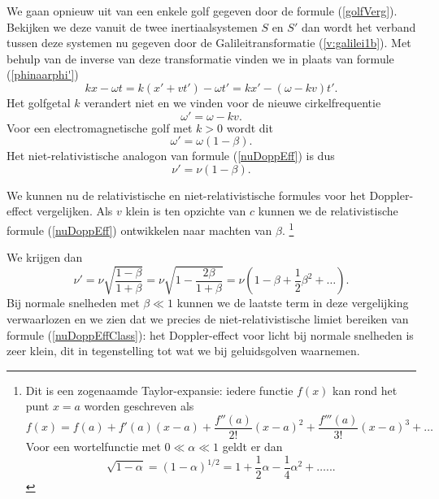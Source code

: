 We gaan opnieuw uit van een enkele golf gegeven door de formule
(\ref{golfVerg}). Bekijken we deze vanuit de twee inertiaalsystemen
$S$ en $S'$ dan wordt het verband tussen deze systemen nu gegeven door
de Galileitransformatie (\ref{v:galilei1b}). Met behulp van de
inverse van deze transformatie vinden we in plaats van formule
(\ref{phinaarphi'})
%
\begin{equation}
kx - \omega t = k(x' + vt') - \omega t' = kx' - (\omega - kv)t' .
\end{equation}
%
Het golfgetal $k$ verandert niet en we vinden voor de nieuwe cirkelfrequentie 
%
\begin{equation}
\omega' = \omega - kv .
\end{equation}
%
Voor een electromagnetische golf met $k > 0$ wordt dit
%
\begin{equation}
\omega' = \omega (1 - \beta) .
\end{equation}
%
Het niet-relativistische analogon van formule (\ref{nuDoppEff}) is dus 
%
\begin{equation} \label{nuDoppEffClass}
\nu' = \nu (1 - \beta) .
\end{equation}
%

We kunnen nu de relativistische en niet-relativistische formules voor het Doppler-effect vergelijken. Als $v$ klein is ten opzichte van $c$ kunnen we de relativistische formule (\ref{nuDoppEff}) ontwikkelen naar machten van $\beta$.
\footnote{ Dit is een zogenaamde Taylor-expansie: iedere functie $f(x)$
kan rond het punt $x = a$ worden geschreven als
\[
f(x) = f(a) + f'(a) (x - a) + \frac{f''(a)}{2!} (x - a)^2 + \frac{f'''(a)}{3!} (x - a)^3 + \ldots 
\]
Voor een wortelfunctie met $0 \ll \alpha \ll 1$ geldt er dan
\[
\sqrt{1 - \alpha} = (1 - \alpha)^{1/2} = 1 + \frac{1}{2} \alpha - \frac{1}{4} \alpha^2 + \ldots...
\]
}

We krijgen dan 
%
\begin{equation} \label{OntwDopp}
\nu' = \nu \sqrt{\frac{1 - \beta}{1 + \beta}} = \nu \sqrt{1 - \frac{2 \beta}{1 + \beta}} = \nu( 1 - \beta + \frac{1}{2} \beta^2 + \ldots) .
\end{equation}
%
Bij normale snelheden met $\beta \ll 1$ kunnen we de laatste term in
deze vergelijking verwaarlozen en we zien dat we precies de
niet-relativistische limiet bereiken van formule
(\ref{nuDoppEffClass}): het Doppler-effect voor licht bij normale
snelheden is zeer klein, dit in tegenstelling tot wat we bij
geluidsgolven waarnemen.

